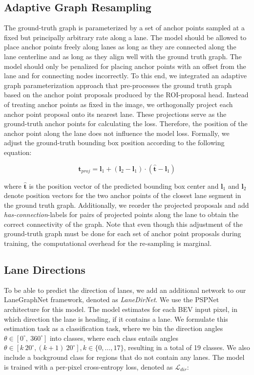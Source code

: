 \documentclass[letterpaper, 10 pt, conference]{ieeeconf}
\begin{document}
\subsection{Adaptive Graph Resampling}

The ground-truth graph is parameterized by a set of anchor points sampled at a fixed but principally arbitrary rate along a  lane. The model should be allowed to place anchor points freely along lanes as long as they are connected along the lane centerline and as long as they align well with the ground truth graph. The model should only be penalized for placing anchor points with an offset from the lane and for connecting nodes incorrectly. To this end, we integrated an adaptive graph parameterization approach that pre-processes the ground truth graph based on the anchor point proposals produced by the ROI-proposal head. Instead of treating anchor points as fixed in the image, we orthogonally project each anchor point proposal onto its nearest lane. These projections serve as the ground-truth anchor points for calculating the loss. Therefore, the position of the anchor point along the lane does not influence the model loss. Formally, we adjust the ground-truth bounding box position according to the following equation:

\begin{equation}
\mathbf{t}_{proj} = \mathbf{l}_1 + (\mathbf{l}_2 - \mathbf{l}_1) \cdot (\hat{\mathbf{t}} - \mathbf{l}_1)
\end{equation}

where $\hat{\mathbf{t}}$ is the position vector of the predicted bounding box center and $\mathbf{l}_1$ and $\mathbf{l}_2$ denote position vectors for the two anchor points of the closest lane segment in the ground truth graph. Additionally, we reorder the projected proposals and add \textit{has-connection}-labels for pairs of projected points along the lane to obtain the correct connectivity of the graph. Note that even though this adjustment of the ground-truth graph must be done for each set of anchor point proposals during training, the computational overhead for the re-sampling is marginal.

\subsection{Lane Directions}

To be able to predict the direction of lanes, we add an additional network to our LaneGraphNet framework, denoted as \textit{LaneDirNet}. We use the PSPNet architecture \cite{zhao2017pyramid} for this model. The model estimates for each BEV input pixel, in which direction the lane is heading, if it contains a lane. We formulate this estimation task as a classification task, where we bin the direction angles $\theta \in [0^{\circ}, ~360^{\circ}]$ into classes, where each class entails angles $\theta \in [k~20^{\circ}, (k+1)~20^{\circ}], k \in \{0,\ldots,17\}$, resulting in a total of 19 classes. We also include a background class for regions that do not contain any lanes. The model is trained with a per-pixel cross-entropy loss, denoted as $\mathcal{L}_{dir}$:
\end{document}
